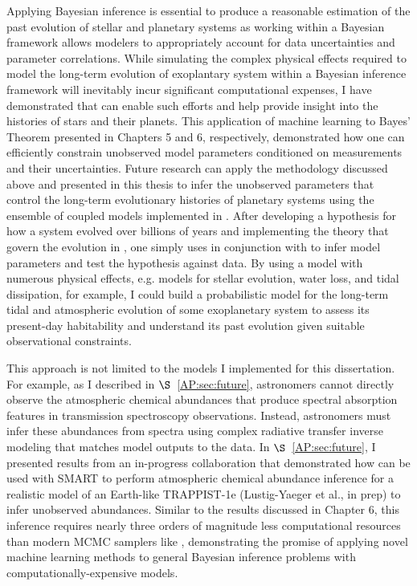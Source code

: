Applying Bayesian inference is essential to produce a reasonable estimation of the past evolution of stellar and planetary systems as working within a Bayesian framework allows modelers to appropriately account for data uncertainties and parameter correlations. While simulating the complex physical effects required to model the long-term evolution of exoplantary system within a Bayesian inference framework will inevitably incur significant computational expenses, I have demonstrated that \approxposterior can enable such efforts and help provide insight into the histories of stars and their planets. This application of machine learning to Bayes' Theorem presented in Chapters 5 and 6, respectively, demonstrated how one can efficiently constrain unobserved model parameters conditioned on measurements and their uncertainties. Future research can apply the methodology discussed above and presented in this thesis to infer the unobserved parameters that control the long-term evolutionary histories of planetary systems using the ensemble of coupled models implemented in \vplanet. After developing a hypothesis for how a system evolved over billions of years and implementing the theory that govern the evolution in \vplanet, one simply uses \vplanet in conjunction with \approxposterior to infer model parameters and test the hypothesis against data. By using a model with numerous physical effects, e.g. models for stellar evolution, water loss, and tidal dissipation, for example, I could build a probabilistic model for the long-term tidal and atmospheric evolution of some exoplanetary system to assess its present-day habitability and understand its past evolution given suitable observational constraints. 

This approach is not limited to the models I implemented \vplanet for this dissertation. For example, as I described in $\S$~\ref{AP:sec:future}, astronomers cannot directly observe the atmospheric chemical abundances that produce spectral absorption features in transmission spectroscopy observations. Instead, astronomers must infer these abundances from spectra using complex radiative transfer inverse modeling that matches model outputs to the data. In $\S$~\ref{AP:sec:future}, I presented results from an in-progress collaboration that demonstrated how \approxposterior can be used with SMART \citep{Meadows1996,Crisp1997} to perform atmospheric chemical abundance inference for a realistic model of an Earth-like TRAPPIST-1e (Lustig-Yaeger et al., in prep) to infer unobserved abundances. Similar to the results discussed in Chapter 6, this inference requires nearly three orders of magnitude less computational resources than modern MCMC samplers like \emcee, demonstrating the promise of applying novel machine learning methods to general Bayesian inference problems with computationally-expensive models.


